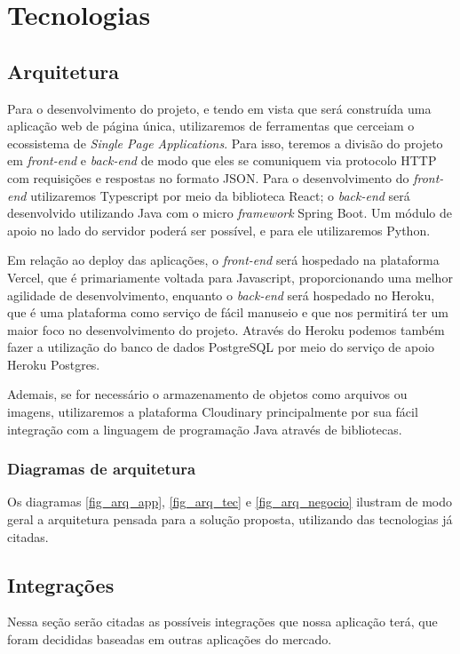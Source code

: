 \chapter{Tecnologias}
\section{Arquitetura}
Para o desenvolvimento do projeto, e tendo em vista que será construída uma aplicação web de página única, utilizaremos de ferramentas que cerceiam o ecossistema de \textit{Single Page Applications}. Para isso, teremos a divisão do projeto em \textit{front-end} e \textit{back-end} de modo que eles se comuniquem via protocolo HTTP com requisições e respostas no formato JSON. Para o desenvolvimento do \textit{front-end} utilizaremos Typescript por meio da biblioteca React; o \textit{back-end} será desenvolvido utilizando Java com o micro \textit{framework} Spring Boot. Um módulo de apoio no lado do servidor poderá ser possível, e para ele utilizaremos Python. 

Em relação ao deploy das aplicações, o \textit{front-end} será hospedado na plataforma Vercel, que é primariamente voltada para Javascript, proporcionando uma melhor agilidade de desenvolvimento, enquanto o \textit{back-end} será hospedado no Heroku, que é uma plataforma como serviço de fácil manuseio e que nos permitirá ter um maior foco no desenvolvimento do projeto. Através do Heroku podemos também fazer a utilização do banco de dados PostgreSQL por meio do serviço de apoio Heroku Postgres.

Ademais, se for necessário o armazenamento de objetos como arquivos ou imagens, utilizaremos a plataforma Cloudinary principalmente por sua fácil integração com a linguagem de programação Java através de bibliotecas.

%
\subsection{Diagramas de arquitetura}
Os diagramas \autoref{fig_arq_app}, \autoref{fig_arq_tec} e \autoref{fig_arq_negocio} ilustram de modo geral a arquitetura pensada para a solução proposta, utilizando das tecnologias já citadas.

\section{Integrações}
Nessa seção serão citadas as possíveis integrações que nossa aplicação terá, que foram decididas baseadas em outras aplicações do mercado.

